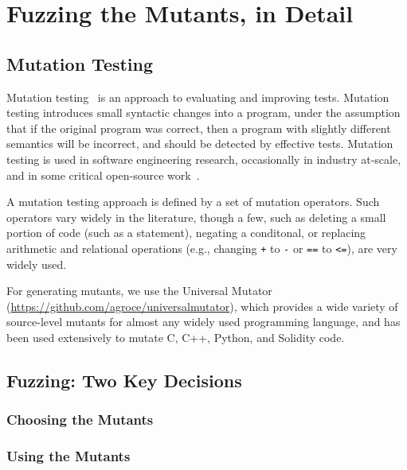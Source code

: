 \section{Fuzzing the Mutants, in Detail}


\subsection{Mutation Testing}

Mutation testing~\cite{MutationSurvey,budd1979mutation,demillo1978hints} is an approach to evaluating and improving tests.  Mutation testing introduces small syntactic changes into a program, under the assumption that if the original program was correct, then a program with slightly different semantics will be incorrect, and should be detected by effective tests.  Mutation testing is used in software engineering research, occasionally in industry at-scale, and in some critical  open-source work~\cite{mutKernel,mutGoogle,mutFacebook}.

A mutation testing approach is defined by a set of mutation operators.  Such operators vary widely in the literature, though a few, such as deleting a small portion of code (such as a statement), negating a conditonal, or replacing arithmetic and relational operations (e.g., changing {\tt +} to {\tt -} or {\tt ==} to {\tt <=}), are very widely used.

For generating mutants, we use the Universal Mutator \cite{regexpMut} (\url{https://github.com/agroce/universalmutator}), which provides a wide variety of source-level mutants for almost any widely used programming language, and has been used extensively to mutate C, C++, Python, and Solidity code.

\subsection{Fuzzing: Two Key Decisions}

\subsubsection{Choosing the Mutants}

\subsubsection{Using the Mutants}